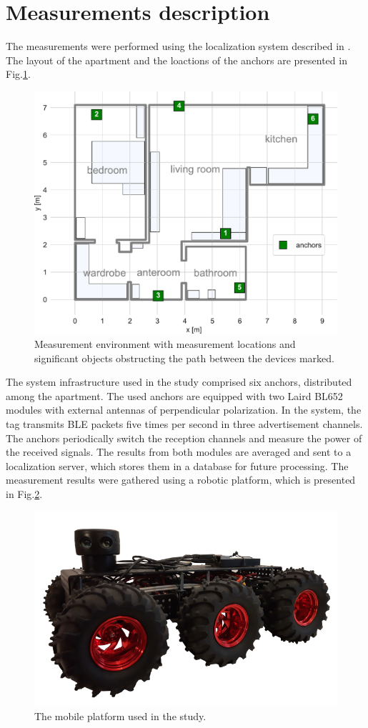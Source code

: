 \documentclass[conference]{IEEEtran}
\begin{document}
\section{Measurements description}

The measurements were performed using the localization system described in \cite{b1}. The layout of the apartment and the loactions of the anchors are presented in Fig.\ref{plan}.

\begin{figure}[h]
\centerline{\includegraphics[width=\columnwidth]{figs/layout}}
\caption{Measurement environment with measurement locations and significant objects obstructing the path between the devices marked.}
\label{plan}
\end{figure}

The system infrastructure used in the study comprised six anchors, distributed among the apartment. The used anchors are equipped with two Laird BL652 modules with external antennas of perpendicular polarization. In the system, the tag transmits BLE packets five times per second in three advertisement channels. The anchors periodically switch the reception channels and measure the power of the received signals. The results from both modules are averaged and sent to a localization server, which stores them in a database for future processing. The measurement results were gathered using a robotic platform, which is presented in Fig.\ref{fig:robot}.

\begin{figure}[h]
\centering
\includegraphics[width=0.7\columnwidth]{figs/robot}
\caption{\label{fig:robot}The mobile platform used in the study.}
\end{figure}
\end{document}
